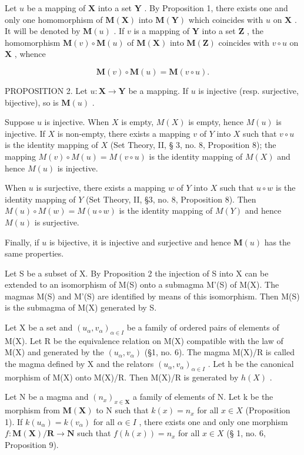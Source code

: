 Let \(u\) be a mapping of \(\mathbf{X}\) into a set \(\mathbf{Y}\) . By Proposition 1, there exists one and only one homomorphism of \(\mathbf{M}(\mathbf{X})\) into \(\mathbf{M}(\mathbf{Y})\) which coincides with \(u\) on \(\mathbf{X}\) . It will be denoted by \(\mathbf{M}(u)\) . If \(v\) is a mapping of \(\mathbf{Y}\) into a set \(\mathbf{Z}\) , the homomorphism \(\mathbf{M}(v) \circ \mathbf{M}(u)\) of \(\mathbf{M}(\mathbf{X})\) into \(\mathbf{M}(\mathbf{Z})\) coincides with \(v \circ u\) on \(\mathbf{X}\) , whence

\[
\mathbf {M} (v) \circ \mathbf {M} (u) = \mathbf {M} (v \circ u).
\]

PROPOSITION 2. Let \(u: \mathbf{X} \to \mathbf{Y}\) be a mapping. If \(u\) is injective (resp. surjective, bijective), so is \(\mathbf{M}(u)\) .

Suppose \(u\) is injective. When \(X\) is empty, \(M(X)\) is empty, hence \(M(u)\) is injective. If \(X\) is non-empty, there exists a mapping \(v\) of \(Y\) into \(X\) such that \(v \circ u\) is the identity mapping of \(X\) (Set Theory, II, § 3, no. 8, Proposition 8); the mapping \(M(v) \circ M(u) = M(v \circ u)\) is the identity mapping of \(M(X)\) and hence \(M(u)\) is injective.

When \(u\) is surjective, there exists a mapping \(w\) of \(Y\) into \(X\) such that \(u \circ w\) is the identity mapping of \(Y\) (Set Theory, II, §3, no. 8, Proposition 8). Then \(M(u) \circ M(w) = M(u \circ w)\) is the identity mapping of \(M(Y)\) and hence \(M(u)\) is surjective.

Finally, if \(u\) is bijective, it is injective and surjective and hence \(\mathbf{M}(u)\) has the same properties.

Let S be a subset of X. By Proposition 2 the injection of S into X can be extended to an isomorphism of M(S) onto a submagma M'(S) of M(X). The magmas M(S) and M'(S) are identified by means of this isomorphism. Then M(S) is the submagma of M(X) generated by S.

Let X be a set and \((u_{\alpha}, v_{\alpha})_{\alpha \in I}\) be a family of ordered pairs of elements of M(X). Let R be the equivalence relation on M(X) compatible with the law of M(X) and generated by the \((u_{\alpha}, v_{\alpha})\) (§1, no. 6). The magma M(X)/R is called the magma defined by X and the relators \((u_{\alpha}, v_{\alpha})_{\alpha \in I}\) . Let h be the canonical morphism of M(X) onto M(X)/R. Then M(X)/R is generated by \(h(X)\) .

Let N be a magma and \((n_{x})_{x\in\mathbf{X}}\) a family of elements of N. Let k be the morphism from \(\mathbf{M}(\mathbf{X})\) to N such that \(k(x)=n_{x}\) for all \(x\in X\) (Proposition 1). If \(k(u_{\alpha})=k(v_{\alpha})\) for all \(\alpha\in I\) , there exists one and only one morphism \(f\colon\mathbf{M}(\mathbf{X})/\mathbf{R}\to\mathbf{N}\) such that \(f(h(x))=n_{x}\) for all \(x\in X\) (§ 1, no. 6, Proposition 9).

